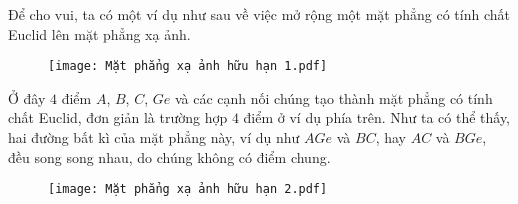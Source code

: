 \documentclass{article}
\begin{document}
	
	
	\vskip 0.1cm
	Để cho vui, ta có một ví dụ như sau về việc mở rộng một mặt phẳng có tính chất Euclid lên mặt phẳng xạ ảnh.
	\begin{figure}[H]
		\vspace*{-5pt}
		\centering
		\captionsetup{labelformat= empty, justification=centering}
		\texttt{[image: Mặt phẳng xạ ảnh hữu hạn 1.pdf]}
		\vspace*{-15pt}
	\end{figure}
	Ở đây $4$ điểm $A$, $B$, $C$, $Ge$ và các cạnh nối chúng tạo thành mặt phẳng có tính chất Euclid, đơn giản là trường hợp $4$ điểm ở ví dụ phía trên. 
	Như ta có thể thấy, hai đường bất kì của mặt phẳng này, ví dụ như $AGe$ và $BC$, hay $AC$ và $BGe$, đều song song nhau, do chúng không có điểm chung. 
	\begin{figure}[H]
		\vspace*{-5pt}
		\centering
		\captionsetup{labelformat= empty, justification=centering}
		\texttt{[image: Mặt phẳng xạ ảnh hữu hạn 2.pdf]}
		\vspace*{-10pt}
	\end{figure}
\end{document}
